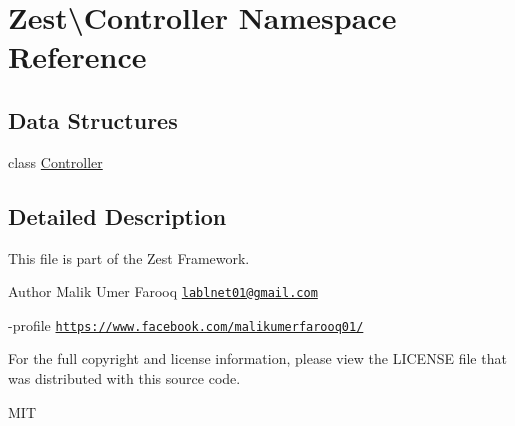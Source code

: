\hypertarget{namespace_zest_1_1_controller}{}\section{Zest\textbackslash{}Controller Namespace Reference}
\label{namespace_zest_1_1_controller}
\subsection*{Data Structures}
\begin{DoxyCompactItemize}
\item 
class \mbox{\hyperlink{class_zest_1_1_controller_1_1_controller}{Controller}}
\end{DoxyCompactItemize}


\subsection{Detailed Description}
This file is part of the Zest Framework.

\begin{DoxyAuthor}{Author}
Malik Umer Farooq \href{mailto:lablnet01@gmail.com}{\tt lablnet01@gmail.\+com} 

-\/profile \href{https://www.facebook.com/malikumerfarooq01/}{\tt https\+://www.\+facebook.\+com/malikumerfarooq01/}
\end{DoxyAuthor}
For the full copyright and license information, please view the L\+I\+C\+E\+N\+SE file that was distributed with this source code.

M\+IT 